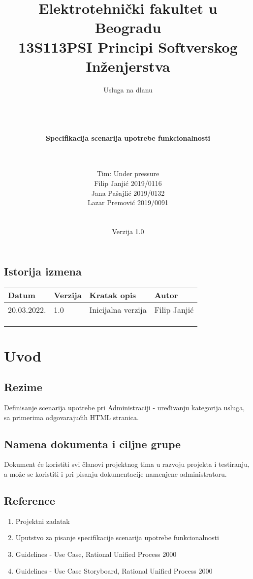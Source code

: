 \documentclass[a4paper,12pt]{report}
\title{\Large Elektrotehnički fakultet u Beogradu \\ 13S113PSI Principi Softverskog Inženjerstva}
\author{\Huge Usluga na dlanu\\ \ \\ \ \\ \ \\ \ \\
	\Large \textbf{Specifikacija scenarija upotrebe funkcionalnosti}\\\Large \textbf{\genitivfunkcionalnosti} \\ \ \\}
\date{\Large   Tim: Under pressure \\ Filip Janjić 2019/0116 \\ Jana Pašajlić 2019/0132 \\ Lazar Premović 2019/0091  \\ \  \\ \  \\
	\large Verzija 1.0}
\newcommand{\dativfunkcionalnosti }{Administraciji - uređivanju kategorija usluga}
\newcommand{\inicijalniautor}{Filip Janjić}
\newcommand{\inicijalnidatum}{20.03.2022.}
\begin{document}
	
	\maketitle
	
	\begin{center}
		\section*{Istorija izmena}
			\begin{tabular}{ |l|l|l|l| }
				\hline
				\textbf{Datum} & \textbf{Verzija} & \textbf{Kratak opis} & \textbf{Autor} \\ 
				\hline
				\inicijalnidatum & 1.0  & Inicijalna verzija & \inicijalniautor \\
				\hline
				&  & &  \\
				\hline
				&  &  &  \\
				\hline
				&  &  &  \\
				\hline
			\end{tabular}
	\end{center}
	
	\newpage
	
	\tableofcontents
	
	\newpage
	
	\section{Uvod}
		\subsection{Rezime}
			Definisanje scenarija upotrebe pri \dativfunkcionalnosti, sa primerima odgovarajućih HTML stranica.
		\subsection{Namena dokumenta i ciljne grupe}
			Dokument će koristiti svi članovi projektnog tima u razvoju projekta i testiranju, a može se koristiti i pri pisanju dokumentacije namenjene administratoru.
		\subsection{Reference}
			\begin{enumerate}
				\item Projektni zadatak
				\item Uputstvo za pisanje specifikacije scenarija upotrebe funkcionalnosti
				\item Guidelines - Use Case, Rational Unified Process 2000
				\item Guidelines - Use Case Storyboard, Rational Unified Process 2000
			\end{enumerate}
\end{document}
